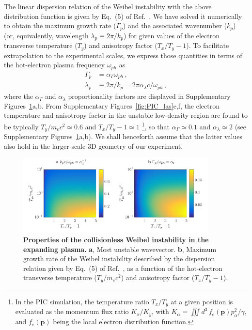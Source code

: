 \documentclass[aps,superscriptaddress]{revtex4}
\begin{document}
The linear dispersion relation of the Weibel instability with the above distribution function is given by Eq.~(5) of Ref.~\cite{POP_Yoon_2007b}. We have solved it numerically to obtain the maximum growth rate ($\Gamma_p$) and the associated wavenumber ($k_p$) (or, equivalently, wavelength $\lambda_p \equiv 2\pi/k_p$) for given values of the electron transverse temperature ($T_y$) and anisotropy factor ($T_x/T_y-1$). To facilitate extrapolation to the experimental scales, we express those quantities in terms of the hot-electron plasma frequency $\omega_{ph}$ as
\begin{align}
    \Gamma_p &= \alpha_\Gamma \omega_{ph} \label{eq:gp} \,,\\
    \lambda_p &\equiv 2\pi/k_p = 2\pi \alpha_\lambda c/\omega_{ph} \label{eq:lp}  \,,
\end{align}
where the $\alpha_\Gamma$ and $\alpha_\lambda$ proportionality factors are displayed in Supplementary Figures~\ref{fig:dispe_yoon}a,b.
From Supplementary Figures~\ref{fig:PIC_las}e,f, the electron temperature and anisotropy factor in the unstable low-density region are found to be typically $T_y/m_ec^2 \simeq 0.6$ and $T_x/T_y -1\simeq 1$ \footnote{In the PIC simulation, the temperature ratio $T_x/T_y$ at a given position is evaluated as the momentum flux ratio $K_x/K_y$, with $K_\alpha = \iiint d^3\,f_e(\mathbf{p})p_\alpha^2/\gamma$, and $f_e(\mathbf{p})$ being the local electron distribution function.}, so that $\alpha_\Gamma \simeq 0.1$ and $\alpha_\lambda \simeq 2$ (see Supplementary Figures~\ref{fig:dispe_yoon}a,b). We shall henceforth assume that the latter values also hold in the larger-scale 3D geometry of our experiment.

\begin{figure}[!t]
\centerline{
\includegraphics[width=0.9\textwidth]{FigS4.pdf}}
\caption{\label{fig:dispe_yoon}
{\bf Properties of the collisionless Weibel instability in the expanding plasma.}
{\bf a}, Most unstable wavevector.
{\bf b}, Maximum growth rate of the Weibel instability described by the dispersion relation given by Eq.~(5) of Ref.~\cite{POP_Yoon_2007b}, as a function of the hot-electron transverse temperature ($T_y/m_ec^2$) and anisotropy factor ($T_x/T_y-1$).
}
\end{figure}
\end{document}
